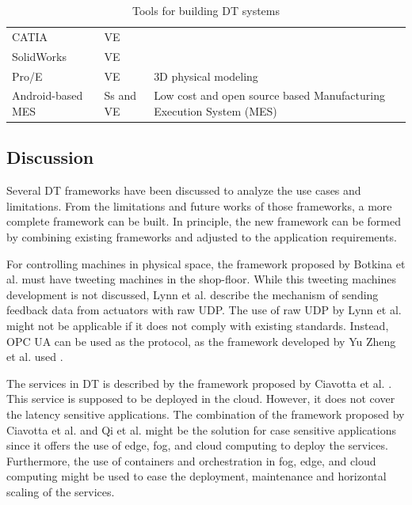 \documentclass[article,table]{aaltoseries}
\begin{document}
\begin{table}[]
\begin{tabular}{|p{3.8cm}|p{1.5cm}|p{5.8cm}|}
		CATIA                                                        & VE             &                                                                                         \\ \cline{1-2}
		SolidWorks                                                   & VE             &                                                                                         \\ \cline{1-2}
		Pro/E                                                        & VE             & \multirow{-3}{*}{3D physical modeling}                                                  \\ \hline
		Android-based MES \cite{UrbinaCoronado2018} & Ss and VE      & Low cost and open source based Manufacturing Execution System (MES)                     \\ \hline
	\end{tabular}
	\caption{Tools for building DT systems}
	\label{tab:table_tools}
\end{table}

\subsection{Discussion}
Several DT frameworks have been discussed to analyze the use cases and limitations. From the limitations and future works of those frameworks, a more complete framework can be built. In principle, the new framework can be formed by combining existing frameworks and adjusted to the application requirements.

For controlling machines in physical space, the framework proposed by Botkina et al. \cite{botkina2018digital} must have tweeting machines in the shop-floor. While this tweeting machines development is not discussed, Lynn et al. \cite{lynn2018realization} describe the mechanism of sending feedback data from actuators with raw UDP. The use of raw UDP by Lynn et al. might not be applicable if it does not comply with existing standards. Instead, OPC UA can be used as the protocol, as the framework developed by Yu Zheng et al. used \cite{zheng2019application}.

The services in DT is described by the framework proposed by Ciavotta et al. \cite{ciavotta2017microservice}. This service is supposed to be deployed in the cloud. However, it does not cover the latency sensitive applications. The combination of the framework proposed by Ciavotta et al. and Qi et al. \cite{qi2018modeling} might be the solution for case sensitive applications since it offers the use of edge, fog, and cloud computing to deploy the services. Furthermore, the use of containers and orchestration in fog, edge, and cloud computing might be used to ease the deployment, maintenance and horizontal scaling of the services. 
\end{document}

